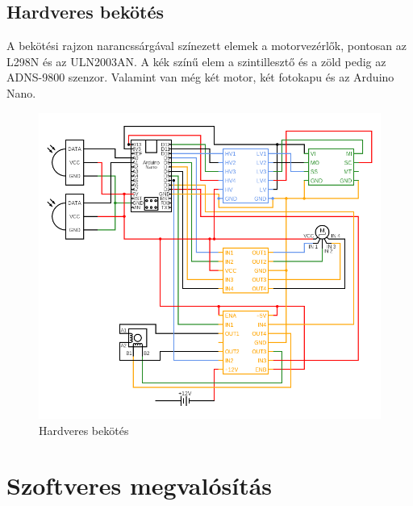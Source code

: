 \documentclass[]{thesis-ekf}
\theoremstyle{definition}
\theoremstyle{remark}
\begin{document}
\section{Hardveres bekötés}
A bekötési rajzon narancssárgával színezett elemek a motorvezérlők, pontosan az L298N és az ULN2003AN. A kék színű elem a szintillesztő és a zöld pedig az ADNS-9800 szenzor. Valamint van még két motor, két fotokapu és az Arduino Nano.
\begin{figure}[th!]
	\centering
	\includegraphics[width=1\linewidth]{circuit}
	\caption[Hardveres bekötés]{Hardveres bekötés}
	\label{fig:circuit}
\end{figure}
\chapter{Szoftveres megvalósítás}
\end{document}
